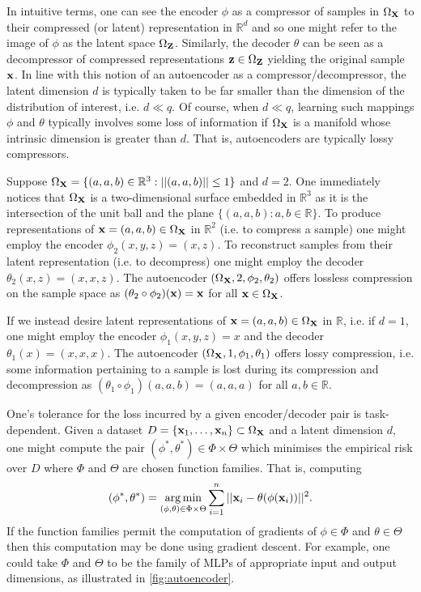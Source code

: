 \documentclass[11pt]{article}
\begin{document}
In intuitive terms, one can see the encoder $\phi$ as a compressor of samples in $\Omega_{\mathbf{X}}$ to their compressed (or latent) representation in $\mathbb{R}^d$ and so one might refer to the image of $\phi$ as the latent space $\Omega_{\mathbf{Z}}$. Similarly, the decoder $\theta$ can be seen as a decompressor of compressed representations $\mathbf{z}\in\Omega_{\mathbf{Z}}$ yielding the original sample $\mathbf{x}$. In line with this notion of an autoencoder as a compressor/decompressor, the latent dimension $d$ is typically taken to be far smaller than the dimension of the distribution of interest, i.e. $d\ll q$. Of course, when $d\ll q$, learning such mappings $\phi$ and $\theta$ typically involves some loss of information if $\Omega_{\mathbf{X}}$ is a manifold whose intrinsic dimension is greater than $d$. That is, autoencoders are typically lossy compressors.

\begin{tcolorbox}[title={\centering\textbf{Autoencoder example}}, colback=myLightBlue, colbacktitle=myDarkBlue, colframe=myDarkBlue, coltitle=white]
    Suppose $\Omega_{\mathbf{X}}=\{(a,a,b)\in\mathbb{R}^3:||(a,a,b)||\leq1\}$ and $d=2$. One immediately notices that $\Omega_{\mathbf{X}}$ is a two-dimensional surface embedded in $\mathbb{R}^3$ as it is the intersection of the unit ball and the plane $\{(a,a,b):a,b\in\mathbb{R}\}$. To produce representations of $\mathbf{x}=(a,a,b)\in\Omega_{\mathbf{X}}$ in $\mathbb{R}^2$ (i.e. to compress a sample) one might employ the encoder $\phi_2(x,y,z)=(x,z)$. To reconstruct samples from their latent representation (i.e. to decompress) one might employ the decoder $\theta_2(x,z)=(x,x,z)$. The autoencoder $(\Omega_{\mathbf{X}},2,\phi_2,\theta_2)$ offers lossless compression on the sample space as $(\theta_2\circ\phi_2)(\mathbf{x})=\mathbf{x}$ for all $\mathbf{x}\in\Omega_{\mathbf{X}}$.
    
    \hspace{15pt} If we instead desire latent representations of $\mathbf{x}=(a,a,b)\in\Omega_{\mathbf{X}}$ in $\mathbb{R}$, i.e. if $d=1$, one might employ the encoder $\phi_1(x,y,z)=x$ and the decoder $\theta_1(x)=(x,x,x)$. The autoencoder $(\Omega_{\mathbf{X}},1,\phi_1,\theta_1)$ offers lossy compression, i.e. some information pertaining to a sample is lost during its compression and decompression as $(\theta_1\circ\phi_1)(a,a,b)=(a,a,a)$ for all $a,b\in\mathbb{R}$.
\end{tcolorbox}

One's tolerance for the loss incurred by a given encoder/decoder pair is task-dependent. Given a dataset $D=\{\mathbf{x}_1,\dots,\mathbf{x}_n\}\subset\Omega_{\mathbf{X}}$ and a latent dimension $d$, one might compute the pair $(\phi^*,\theta^*)\in\Phi\times\Theta$ which minimises the empirical risk over $D$ where $\Phi$ and $\Theta$ are chosen function families. That is, computing
$$
(\phi^*,\theta^*)
=
\operatorname*{arg\,min}_{(\phi,\theta)\in\Phi\times\Theta}
\sum_{i=1}^n||\mathbf{x}_i-\theta(\phi(\mathbf{x}_i))||^2.
$$
If the function families permit the computation of gradients of $\phi\in\Phi$ and $\theta\in\Theta$ then this computation may be done using gradient descent. For example, one could take $\Phi$ and $\Theta$ to be the family of MLPs of appropriate input and output dimensions, as illustrated in \autoref{fig:autoencoder}.
\end{document}
